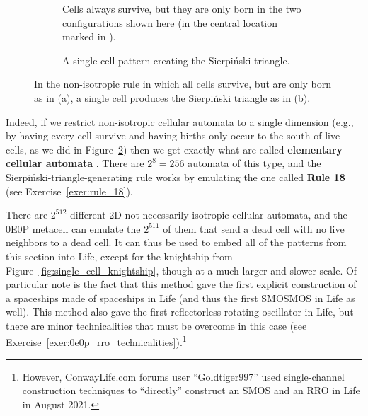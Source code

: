 \begin{figure}[!htb]
	\centering
	\begin{subfigure}{.42\textwidth}
		\centering
		\caption{Cells always survive, but they are only born in the two configurations shown here (in the central location marked in ).}
		\label{fig:non_iso_rule_18}
	\end{subfigure} \hfill \begin{subfigure}{.53\textwidth}
		\centering
		\caption{A single-cell pattern creating the Sierpi\'{n}ski triangle.}
		\label{fig:single_cell_sierpinski}
	\end{subfigure}
	\caption{In the non-isotropic rule in which all cells survive, but are only born as in (a), a single cell produces the Sierpi\'{n}ski triangle as in (b).}\label{fig:single_cell_weird}
\end{figure}

Indeed, if we restrict non-isotropic cellular automata to a single dimension (e.g., by having every cell survive and having births only occur to the south of live cells, as we did in Figure~\ref{fig:single_cell_sierpinski}) then we get exactly what are called \textbf{elementary cellular automata} \cite{Wolfram2002}. There are $2^8 = 256$ automata of this type, and the Sierpi\'{n}ski-triangle-generating rule works by emulating the one called \textbf{Rule 18} (see Exercise~\ref{exer:rule_18}).

There are $2^{512}$ different 2D not-necessarily-isotropic cellular automata, and the 0E0P metacell can emulate the $2^{511}$ of them that send a dead cell with no live neighbors to a dead cell. It can thus be used to embed all of the patterns from this section into Life, except for the knightship from Figure~\ref{fig:single_cell_knightship}, though at a much larger and slower scale. Of particular note is the fact that this method gave the first explicit construction of a spaceships made of spaceships in Life (and thus the first SMOSMOS in Life as well). This method also gave the first reflectorless rotating oscillator in Life, but there are minor technicalities that must be overcome in this case (see Exercise~\ref{exer:0e0p_rro_technicalities}).\footnote{However, ConwayLife.com forums user ``Goldtiger997'' used single-channel construction techniques to ``directly'' construct an SMOS and an RRO in Life in August 2021.}


